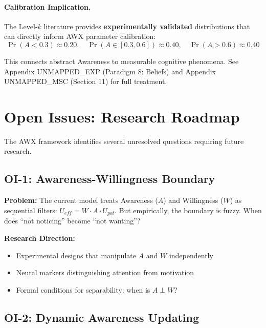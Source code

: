\paragraph{Calibration Implication.}
The Level-$k$ literature provides \textbf{experimentally validated} distributions that can
directly inform AWX parameter calibration:
\begin{equation}
\Pr(A < 0.3) \approx 0.20, \quad \Pr(A \in [0.3, 0.6]) \approx 0.40, \quad \Pr(A > 0.6) \approx 0.40
\tag{AU-LK}
\end{equation}

This connects abstract Awareness to measurable cognitive phenomena.
See Appendix UNMAPPED_EXP (Paradigm 8: Beliefs) and Appendix UNMAPPED_MSC (Section 11) for full treatment.



\section{Open Issues: Research Roadmap}
\label{sec:open-issues}

The AWX framework identifies several unresolved questions requiring future research.

\subsection{OI-1: Awareness-Willingness Boundary}

\textbf{Problem:} The current model treats Awareness ($A$) and Willingness ($W$) as sequential filters: $U_{eff} = W \cdot A \cdot U_{pot}$. But empirically, the boundary is fuzzy. When does ``not noticing'' become ``not wanting''?

\textbf{Research Direction:}
\begin{itemize}[nosep]
    \item Experimental designs that manipulate $A$ and $W$ independently
    \item Neural markers distinguishing attention from motivation
    \item Formal conditions for separability: when is $A \perp W$?
\end{itemize}

\subsection{OI-2: Dynamic Awareness Updating}

